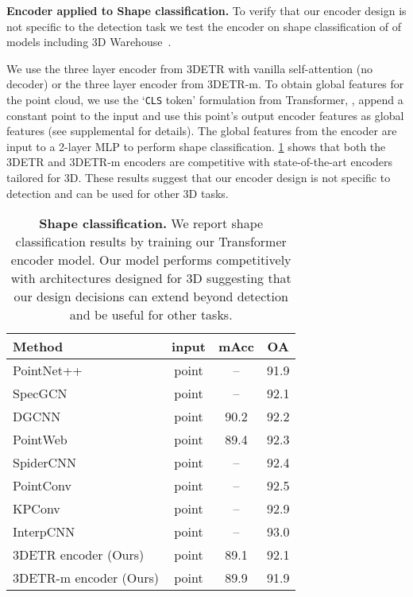 \documentclass[10pt,twocolumn,letterpaper]{article}
\newcommand{\OURS}{3DETR\xspace}
\newcommand{\OURSm}{3DETR-m\xspace}
\newcommand{\colorrow}{\rowcolor{highlightRowColor}}
\begin{document}
\vspace{0.05in}
\par \noindent \textbf{Encoder applied to Shape classification.}
To verify that our encoder design is not specific to the detection task we test the encoder on shape classification of of models including 3D Warehouse~\cite{wu20153d}.

We use the three layer encoder from \OURS with vanilla self-attention (no decoder) or the three layer encoder from \OURSm.
To obtain global features for the point cloud, we use the `\texttt{CLS} token' formulation from Transformer, \ie, append a constant point to the input and use this point's output encoder features as global features (see supplemental for details).
The global features from the encoder are input to a 2-layer MLP to perform shape classification.
\cref{tab:shape_cls} shows that both the \OURS and \OURSm encoders are competitive with state-of-the-art encoders tailored for 3D.
These results suggest that our encoder design is not specific to detection and can be used for other 3D tasks.

\begin{table}[!t]
    \centering
    \setlength{\tabcolsep}{0.4em}
        \begin{tabular}{@{}l|ccc@{}}
        \toprule
        {\bf Method} & {\bf input} & {\bf mAcc} & {\bf OA} \\
        \hline
                
                        
                                                                                        

        \hline
        PointNet++~\cite{qi2017pointnet++} & point & -- & 91.9 \\
        SpecGCN~\cite{wang2018local} & point  & -- & 92.1 \\          DGCNN~\cite{wang2019dynamic} & point & 90.2 & 92.2 \\
        PointWeb~\cite{zhao2019pointweb} & point  & 89.4 & 92.3 \\
        SpiderCNN~\cite{xu2018spidercnn} & point  & -- & 92.4 \\
        PointConv~\cite{wu2019pointconv} & point  & -- & 92.5 \\
        KPConv~\cite{thomas2019kpconv} & point  & -- & 92.9 \\
        InterpCNN~\cite{mao2019interpolated} & point & -- & 93.0 \\
                \hline
                \colorrow \OURS encoder (Ours) & point & 89.1 & 92.1 \\          \colorrow \OURSm encoder (Ours) & point & 89.9 & 91.9 \\          \bottomrule
    \end{tabular}
        \vspace{-0.1in}
    \caption{\textbf{Shape classification.} We report shape classification results by training our Transformer encoder model.
    Our model performs competitively with architectures designed for 3D suggesting that our design decisions can extend beyond detection and be useful for other tasks.
    }
\label{tab:shape_cls}
\end{table}
\end{document}
